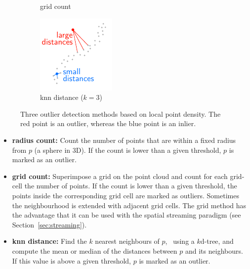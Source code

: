 \begin{figure}
\begin{subfigure}[b]{0.3\linewidth}
    \caption{grid count}
  \end{subfigure}
  \begin{subfigure}[b]{0.3\linewidth}
    \centering
    \includegraphics[width=\textwidth]{knn-distance.pdf}
    \caption{knn distance ($k=3$)}
  \end{subfigure}
\caption{Three outlier detection methods based on local point density. The red point is an outlier, whereas the blue point is an inlier.}%
\label{fig:outlier-detection}
\end{figure}

\begin{itemize}
  \item \textbf{radius count:} Count the number of points that are within a fixed radius from $p$ (a sphere in 3D). If the count is lower than a given threshold, $p$ is marked as an outlier.
  \item \textbf{grid count:} Superimpose a grid on the point cloud and count for each grid-cell the number of points. If the count is lower than a given threshold, the points inside the corresponding grid cell are marked as outliers. Sometimes the neighbourhood is extended with adjacent grid cells. The grid method has the advantage that it can be used with the spatial streaming paradigm (see Section~\ref{sec:streaming}).
  \item \textbf{knn distance:} Find the $k$ nearest neighbours of $p$, \eg\ using a $k$d-tree, and compute the mean or median of the distances between $p$ and its neighbours. If this value is above a given threshold, $p$ is marked as an outlier.
\end{itemize}

